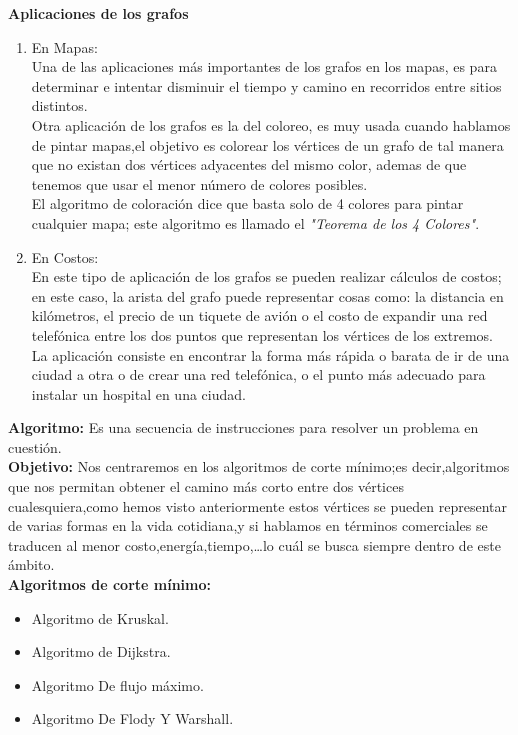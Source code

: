 \documentclass[a4,papper]{IEEEtran}
\begin{document}
\newpage
{\noindent \large \bf {Aplicaciones de los grafos}}\\
\begin{enumerate}
    \item En Mapas:\\
     Una de las aplicaciones más importantes de los grafos en los mapas, es para determinar e intentar disminuir el tiempo y camino en recorridos entre sitios distintos.\\
     Otra aplicación de los grafos es la del coloreo, es muy usada cuando hablamos de pintar mapas,el objetivo es colorear los vértices de un grafo de tal manera que no existan dos vértices adyacentes del mismo color, ademas de que tenemos que usar el menor número de colores posibles.\\
    El algoritmo de coloración dice que basta solo de 4 colores para pintar cualquier mapa; este algoritmo es llamado el {\emph{"Teorema de los 4 Colores"}}.
    \item En Costos:\\
    En este tipo de aplicación de los grafos se pueden realizar cálculos de costos; en este caso, la arista del grafo puede representar cosas como: la distancia en kilómetros, el precio de un tiquete de avión o el costo de expandir una red telefónica entre los dos puntos que representan los vértices de los extremos.\\
    La aplicación consiste en encontrar la forma más rápida o barata de ir de una ciudad a otra o de crear una red telefónica, o el punto más adecuado para instalar un hospital en una ciudad.\\

\end{enumerate}
{\noindent \large \bf {Algoritmo:}}
Es una secuencia de instrucciones para resolver un problema en cuestión.\\
{\noindent \large \bf {Objetivo:}}
 Nos centraremos en los algoritmos de corte mínimo;es decir,algoritmos que nos permitan obtener el camino más corto entre dos vértices cualesquiera,como hemos visto anteriormente estos vértices se pueden representar de varias formas en la vida cotidiana,y si hablamos en términos comerciales se traducen al menor costo,energía,tiempo,\ldots lo cuál se busca siempre dentro de este ámbito.\\
{\noindent \large \bf {Algoritmos de corte mínimo:}}
\begin{itemize}[]
    \item Algoritmo de Kruskal.
    \item Algoritmo de Dijkstra.
    \item Algoritmo De flujo máximo.
    \item Algoritmo De Flody Y Warshall.
\end{itemize}
\end{document}
